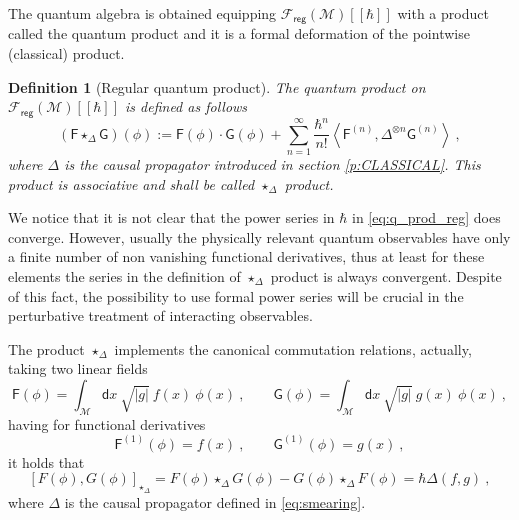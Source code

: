 \documentclass[11pt]{book}
\newcommand{\reg}{\mathsf{reg}}
\newcommand{\abs}[1]{\left|#1\right|}
\newcommand{\sm}[1]{\left\langle#1\right\rangle}
\newcommand{\Fcal}{\mathcal{F}}
\newcommand{\Mcal}{\mathcal{M}}
\newcommand{\Fsf}{\mathsf{F}}
\newcommand{\Gsf}{\mathsf{G}}
\newcommand{\dsf}{\mathsf{d}}
\theoremstyle{break}
\newtheorem{definition}{Definition}[chapter]
\begin{document}
The quantum algebra is obtained equipping $\Fcal_\reg(\Mcal)[[\hbar]]$ with a product called the quantum product and it is a formal deformation of the pointwise (classical) product.


\begin{definition}[Regular quantum product]
The quantum product on $\Fcal_\reg(\Mcal)[[\hbar]]$ is defined as follows
%
\begin{equation}
(\Fsf \star_\Delta \Gsf)(\phi) := \Fsf(\phi) \cdot \Gsf(\phi) + \sum_{n=1}^\infty \frac{\hbar^n}{n!} \sm{ \Fsf^{(n)} , \Delta^{\otimes n} \Gsf^{(n) } } \ ,
\label{eq:q_prod_reg}
\end{equation}
%
where $\Delta$ is the causal propagator introduced in section \ref{p:CLASSICAL}. This product is associative and shall be called $\star_\Delta$ product.
\end{definition}


We notice that it is not clear that the power series in $\hbar$ in \eqref{eq:q_prod_reg} does converge. However, usually the physically relevant quantum observables have only a finite number of non vanishing functional derivatives, thus at least for these elements the series in the definition of $\star_\Delta$ product is always convergent. Despite of this fact, the possibility to use formal power series will be crucial in the perturbative treatment of interacting observables.


\bigskip


The product $\star_\Delta$ implements the canonical commutation relations, actually, taking two linear fields 
%
\begin{equation*}
\Fsf(\phi) = \int_\Mcal \dsf x \ \sqrt{\abs{g}} \ f(x) \ \phi(x) \ , \qquad \Gsf(\phi) = \int_\Mcal \dsf x \ \sqrt{\abs{g}} \ g(x) \ \phi(x) \ ,
\end{equation*}
%
having for functional derivatives
%
\begin{equation*}
\Fsf^{(1)}(\phi) = f(x) \ , \qquad \Gsf^{(1)}(\phi) = g(x) \ ,
\end{equation*}
%
it holds that 
%
\begin{equation}
\left[F(\phi),G(\phi)\right]_{\star_\Delta} =  F(\phi) \star_\Delta G(\phi) - G(\phi) \star_\Delta F(\phi) =  \hbar \Delta(f,g) \ ,
\label{eq:ccr_linear}
\end{equation}
%
where $\Delta$ is the causal propagator defined in \eqref{eq:smearing}.


\bigskip
\end{document}
